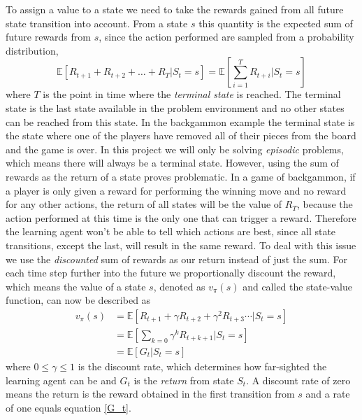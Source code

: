 \documentclass[11pt]{article}
\begin{document}
To assign a value to a state we need to take the rewards
gained from all future state transition into account.
From a state $s$ this quantity is the expected sum of
future rewards from $s$, since the action performed are
sampled from a probability distribution,
\begin{equation}\label{G_t}
    \mathds{E}[R_{t+1} + R_{t+2} + \hdots + R_{T} | S_t = s] = \mathds{E}[\sum\limits_{i = 1}^T R_{t+i} | S_t = s]
\end{equation}
where $T$ is the point in time where the \textit{terminal state} is reached.
The terminal state is the last state available in the problem environment and
no other states can be reached from this state.
In the backgammon example the terminal state is the state where one of the players
have removed all of their pieces from the board and the game is over.
In this project we will only be solving \textit{episodic} problems, which
means there will always be a terminal state.
However, using the sum of rewards as the return of a state proves problematic.
In a game of backgammon, if a player is only given a reward for performing the winning move
and no reward for any other actions, the return of all states will be
the value of $R_T$, because the action performed at this time is the only one
that can trigger a reward.
Therefore the learning agent won't be able to tell which actions are best,
since all state transitions, except the last, will result in the same reward.
To deal with this issue we use the \textit{discounted} sum of rewards as our return instead
of just the sum.
For each time step further into the future
we proportionally discount the reward, which means the value
of a state $s$, denoted as $v_\pi(s)$ and called the state-value function, can now be described as
\begin{equation}\label{gammaG_t}
    \begin{aligned}
        v_\pi(s) &= \mathds{E}[R_{t+1} + \gamma R_{t+2} + \gamma^2 R_{t+3} \cdots | S_t = s]\\
        &= \mathds{E}[ \sum\limits_{k = 0} \gamma^k R_{t+k+1} | S_t = s]\\
        &= \mathds{E}[ G_t | S_t = s]
    \end{aligned}
\end{equation}
where $ 0 \leq \gamma \leq 1$ is the discount rate, which determines how far-sighted the learning agent can be
and $G_t$ is the \textit{return} from state $S_t$.
A discount rate of zero means the return is the reward obtained in the first transition from $s$ and a rate of
one equals equation \ref{G_t}.
\end{document}
